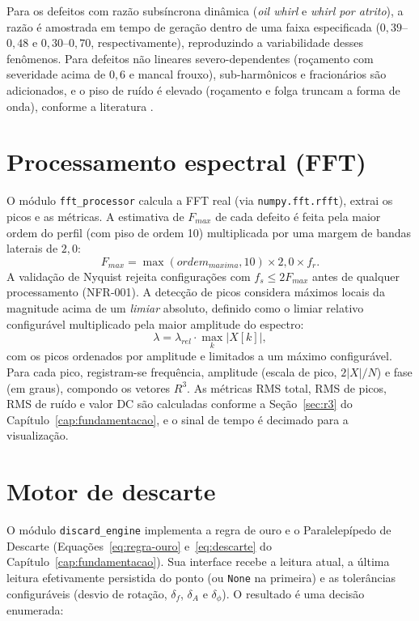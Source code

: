 Para os defeitos com razão subsíncrona dinâmica (\emph{oil whirl} e \emph{whirl
por atrito}), a razão é amostrada em tempo de geração dentro de uma faixa
especificada (\(0{,}39\)--\(0{,}48\) e \(0{,}30\)--\(0{,}70\), respectivamente),
reproduzindo a variabilidade desses fenômenos. Para defeitos não lineares
severo-dependentes (roçamento com severidade acima de \(0{,}6\) e mancal frouxo),
sub-harmônicos e fracionários são adicionados, e o piso de ruído é elevado
(roçamento e folga truncam a forma de onda), conforme a literatura
\cite{randall2011,scheffer2004}.

\section{Processamento espectral (FFT)}

O módulo \texttt{fft\_processor} calcula a FFT real (via \texttt{numpy.fft.rfft}), extrai os
picos e as métricas. A estimativa de \(F_{max}\) de cada defeito é feita pela
maior ordem do perfil (com piso de ordem 10) multiplicada por uma margem de
bandas laterais de \(2{,}0\):
\begin{equation}
\label{eq:fmax}
  F_{max} = \max\left(ordem_{maxima}, 10\right)\times 2{,}0 \times f_r .
\end{equation}
A validação de Nyquist rejeita configurações com \(f_s \le 2F_{max}\) antes de
qualquer processamento (NFR-001). A detecção de picos considera máximos locais
da magnitude acima de um \emph{limiar} absoluto, definido como o limiar relativo
configurável multiplicado pela maior amplitude do espectro:
\begin{equation}
\label{eq:limiar}
  \lambda = \lambda_{rel} \cdot \max_k |X[k]|,
\end{equation}
com os picos ordenados por amplitude e limitados a um máximo configurável. Para
cada pico, registram-se frequência, amplitude (escala de pico, \(2|X|/N\)) e
fase (em graus), compondo os vetores \(R^3\). As métricas RMS total, RMS de
picos, RMS de ruído e valor DC são calculadas conforme a
Seção~\ref{sec:r3} do Capítulo~\ref{cap:fundamentacao}, e o sinal de tempo é
decimado para a visualização.

\section{Motor de descarte}

O módulo \texttt{discard\_engine} implementa a regra de ouro e o Paralelepípedo de
Descarte (Equações~\eqref{eq:regra-ouro} e~\eqref{eq:descarte} do
Capítulo~\ref{cap:fundamentacao}). Sua interface recebe a leitura atual, a
última leitura efetivamente persistida do ponto (ou \texttt{None} na primeira) e as
tolerâncias configuráveis (desvio de rotação, \(\delta_f\), \(\delta_A\) e
\(\delta_\phi\)). O resultado é uma decisão enumerada:

